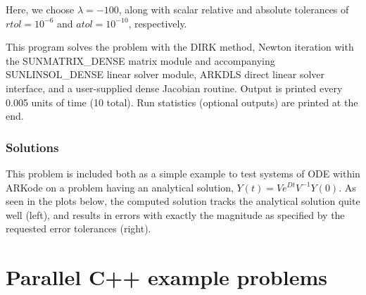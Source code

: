 \documentclass[letterpaper,10pt,english]{sphinxmanual}
\begin{document}
Here, we choose \(\lambda = -100\), along with scalar relative and
absolute tolerances of \(rtol=10^{-6}\) and \(atol=10^{-10}\),
respectively.

This program solves the problem with the DIRK method,
Newton iteration with the SUNMATRIX\_DENSE matrix module and
accompanying SUNLINSOL\_DENSE linear solver module, ARKDLS direct
linear solver interface, and a user-supplied dense Jacobian
routine.  Output is printed every 0.005 units of time (10 total).
Run statistics (optional outputs) are printed at the end.


\subsection{Solutions}
\label{\detokenize{cpp_serial:solutions}}
This problem is included both as a simple example to test systems of
ODE within ARKode on a problem having an analytical solution,
\(Y(t) = V e^{Dt} V^{-1} Y(0)\).  As seen in the plots below, the
computed solution tracks the analytical solution quite well (left),
and results in errors with exactly the magnitude as specified by the
requested error tolerances (right).

\noindent{}

\noindent{}


\chapter{Parallel C++ example problems}
\label{\detokenize{cpp_parallel::doc}}\label{\detokenize{cpp_parallel:parallel-c-example-problems}}\label{\detokenize{cpp_parallel:parallel-cpp}}
\end{document}
